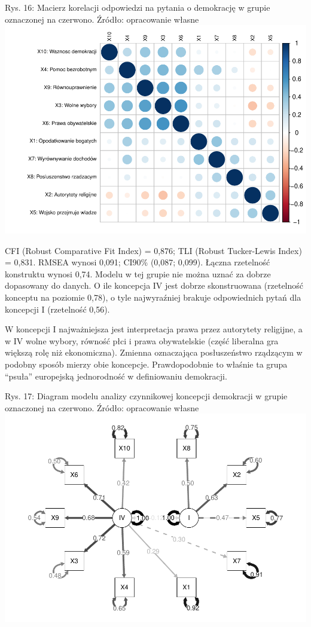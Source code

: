 \documentclass[12pt]{article}
\begin{document}
Rys. 16: Macierz korelacji odpowiedzi na pytania o demokrację w grupie oznaczonej na czerwono. Źródło: opracowanie własne
\includegraphics{text_ASA_files/figure-latex/cor-matrix-3-1.pdf}

CFI (Robust Comparative Fit Index) = 0,876; TLI (Robust Tucker-Lewis Index) = 0,831. RMSEA wynosi 0,091; CI90\% (0,087; 0,099). Łączna rzetelność konstruktu wynosi 0,74. Modelu w tej grupie nie można uznać za dobrze dopasowany do danych. O ile koncepcja IV jest dobrze skonstruowana (rzetelność konceptu na poziomie 0,78), o tyle najwyraźniej brakuje odpowiednich pytań dla koncepcji I (rzetelność 0,56).

W koncepcji I najważniejsza jest interpretacja prawa przez autorytety religijne, a w IV wolne wybory, równość płci i prawa obywatelskie (część liberalna gra większą rolę niż ekonomiczna). Zmienna oznaczająca posłuszeństwo rządzącym w podobny sposób mierzy obie koncepcje. Prawdopodobnie to właśnie ta grupa ``psuła'' europejską jednorodność w definiowaniu demokracji.

Rys. 17: Diagram modelu analizy czynnikowej koncepcji demokracji w grupie oznaczonej na czerwono. Źródło: opracowanie własne
\includegraphics{text_ASA_files/figure-latex/diagram-3-1.pdf}
\end{document}
